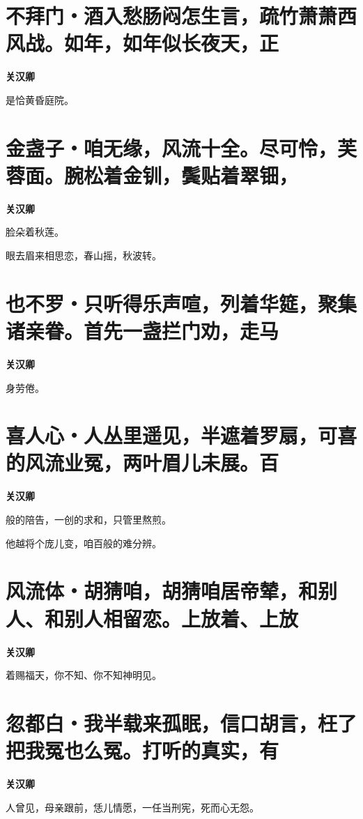 \documentclass[12pt,a4paper]{ctexbook}
\begin{document}
\section{不拜门・酒入愁肠闷怎生言，疏竹萧萧西风战。如年，如年似长夜天，正}
\textbf{关汉卿}\par\vspace{0.5em}
是恰黄昏庭院。\par

\section{金盏子・咱无缘，风流十全。尽可怜，芙蓉面。腕松着金钏，鬓贴着翠钿，}
\textbf{关汉卿}\par\vspace{0.5em}
脸朵着秋莲。\par
眼去眉来相思恋，春山摇，秋波转。\par

\section{也不罗・只听得乐声喧，列着华筵，聚集诸亲眷。首先一盏拦门劝，走马}
\textbf{关汉卿}\par\vspace{0.5em}
身劳倦。\par

\section{喜人心・人丛里遥见，半遮着罗扇，可喜的风流业冤，两叶眉儿未展。百}
\textbf{关汉卿}\par\vspace{0.5em}
般的陪告，一创的求和，只管里熬煎。\par
他越将个庞儿变，咱百般的难分辨。\par

\section{风流体・胡猜咱，胡猜咱居帝辇，和别人、和别人相留恋。上放着、上放}
\textbf{关汉卿}\par\vspace{0.5em}
着赐福天，你不知、你不知神明见。\par

\section{忽都白・我半载来孤眠，信口胡言，枉了把我冤也么冤。打听的真实，有}
\textbf{关汉卿}\par\vspace{0.5em}
人曾见，母亲跟前，恁儿情愿，一任当刑宪，死而心无怨。\par
\end{document}
